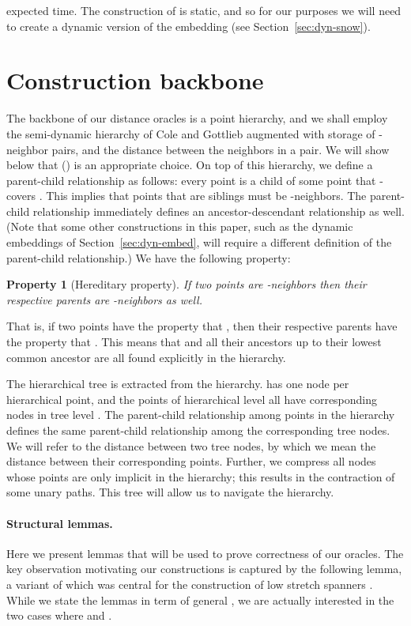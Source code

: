 \documentclass[11pt]{article}
\newtheorem{property}{Property}
\begin{document}
expected time. The construction of \cite{GuKrLe03} is static, and so for our purposes we
will need to create a dynamic version of the embedding (see
Section~\ref{sec:dyn-snow}).


\section{Construction backbone}\label{sec:backbone}

The backbone of our distance oracles is a point hierarchy, and we shall employ the semi-dynamic 
hierarchy of Cole and Gottlieb \cite{CoGo06} augmented with storage of -neighbor pairs, and 
the distance between the neighbors in a pair. We will show below that  
() is an appropriate choice. On top of this hierarchy, we define a 
parent-child relationship as follows: every point  is a child of some point  that -covers . This implies that points that are siblings must 
be -neighbors. The parent-child relationship immediately 
defines an ancestor-descendant relationship as well. (Note that some other constructions in 
this paper, such as the dynamic embeddings of Section~\ref{sec:dyn-embed}, will require a 
different definition of the parent-child relationship.) We have the following property:

\begin{property}[Hereditary property]\label{prop:hereditary}
If two points  are -neighbors
then their respective parents  are -neighbors as well.
\end{property}

That is, if two points  have the property that
, then their respective parents  have the property that
. 
This means that  and all their ancestors up to their lowest common ancestor are all
found explicitly in the hierarchy.

The hierarchical tree  is extracted from the hierarchy.  has one node per 
hierarchical point, and the points of hierarchical level  all have 
corresponding nodes in tree level . The parent-child relationship among points in 
the hierarchy defines the same parent-child relationship among the corresponding tree 
nodes. We will refer to the distance between two tree nodes, by which we mean the 
distance between their corresponding points. Further, we compress all nodes whose 
points are only implicit in the hierarchy; this results in the contraction of some 
unary paths. This tree will allow us to navigate the hierarchy.

\paragraph{Structural lemmas.} Here we present lemmas that will be used to prove 
correctness of our oracles. The key observation motivating our constructions is 
captured by the following lemma, a variant of which was central for the construction 
of low stretch spanners \cite{GaoGuiNgu04,Ro07,GoRo08a,GoRo08b}. While we state the 
lemmas in term of general , we are actually interested in the two cases where  
and .
\end{document}
